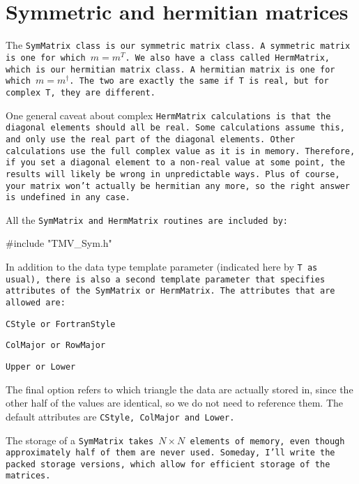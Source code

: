 
\section{Symmetric and hermitian matrices}
\label{SymMatrix}

The \tt{SymMatrix} class is our symmetric matrix class.  A symmetric matrix is
one for which $m = m^T$.  We also have a class called
\tt{HermMatrix}, which is our hermitian matrix class.  A hermitian matrix
is one for which $m = m^\dagger$.  The two are exactly the same 
if \tt{T} is real, but for complex \tt{T}, they are different.

One general caveat about complex \tt{HermMatrix} calculations is that the diagonal
elements should all be real.  Some calculations assume this, and only 
use the real part of the diagonal elements.  Other calculations use the 
full complex value as it is in memory.  Therefore, if you set a diagonal element 
to a non-real value at some point, the results will likely be wrong in
unpredictable ways.  Plus of course, your matrix won't actually be hermitian any more,
so the right answer is undefined in any case.

All the \tt{SymMatrix} and \tt{HermMatrix} routines are included by:
\begin{tmvcode}
#include "TMV_Sym.h"
\end{tmvcode}

In addition to the data type template parameter (indicated here by \tt{T} as usual),
there is also a second template parameter that specifies attributes of the
\tt{SymMatrix} or \tt{HermMatrix}.  The attributes that are allowed are:
\begin{description} \itemsep -2pt
\item[$\bullet$] \tt{CStyle} or \tt{FortranStyle}
\item[$\bullet$] \tt{ColMajor} or \tt{RowMajor}
\item[$\bullet$] \tt{Upper} or \tt{Lower}
\end{description}
The final option refers to which triangle the data are actually stored in, 
since the
other half of the values are identical, so we do not need to reference them.
The default attributes are \tt{CStyle}, \tt{ColMajor} and \tt{Lower}.

The storage of a \tt{SymMatrix} takes
$N \times N$ elements of memory, even though approximately half of them 
are never used.  Someday, I'll write the packed storage versions, which allow for
efficient storage of the matrices.

